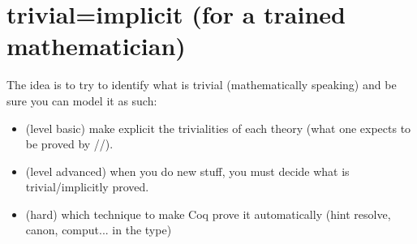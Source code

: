 \section{trivial=implicit (for a trained mathematician)}
The idea is to try to identify what is trivial (mathematically speaking)
and be sure you can model it as such:
\begin{itemize}
\item (level basic) make explicit the trivialities of each theory (what one
	expects to be proved by //). 
\item (level advanced) when you do new stuff, you must decide what is
	trivial/implicitly proved.
\item (hard) which technique to make Coq prove it automatically (hint resolve,
	canon, comput... in the type)
\end{itemize}




